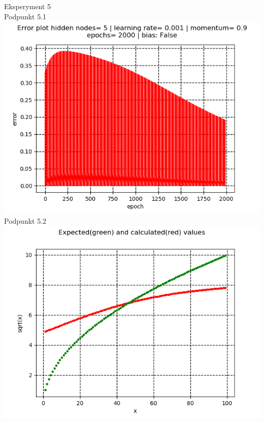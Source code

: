 \documentclass{classrep}
\begin{document}
{Eksperyment 5\\
Podpunkt 5.1\\
\includegraphics[scale=0.8]{imgs/5_1.png}\\
Podpunkt 5.2\\
\includegraphics[scale=0.8]{imgs/5_2.png}\\

}
\end{document}
